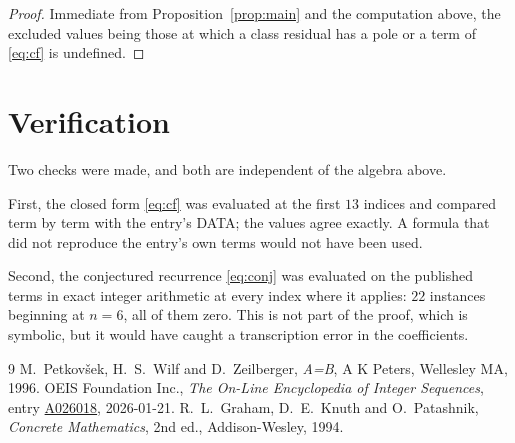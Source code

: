 \documentclass[11pt,a4paper]{article}
\theoremstyle{plain}
\theoremstyle{definition}
\begin{document}
\begin{proof}
Immediate from Proposition~\ref{prop:main} and the computation above, the excluded values
being those at which a class residual has a pole or a term of \eqref{eq:cf} is undefined.
\end{proof}

\section{Verification}

Two checks were made, and both are independent of the algebra above.

First, the closed form \eqref{eq:cf} was evaluated at the first $13$ indices and
compared term by term with the entry's DATA; the values agree exactly. A formula that did
not reproduce the entry's own terms would not have been used.

Second, the conjectured recurrence \eqref{eq:conj} was evaluated on the published terms in
exact integer arithmetic at every index where it applies: $22$ instances beginning at
$n=6$, all of them zero. This is not part of the proof, which is symbolic, but it
would have caught a transcription error in the coefficients.

\begin{thebibliography}{9}
 M.~Petkov\v{s}ek, H.~S.~Wilf and D.~Zeilberger, \emph{A=B}, A K Peters,
Wellesley MA, 1996.
 OEIS Foundation Inc., \emph{The On-Line Encyclopedia of Integer Sequences},
entry \href{https://oeis.org/A026018}{A026018}, 2026-01-21.
 R.~L.~Graham, D.~E.~Knuth and O.~Patashnik, \emph{Concrete Mathematics},
2nd ed., Addison-Wesley, 1994.
\end{thebibliography}
\end{document}
